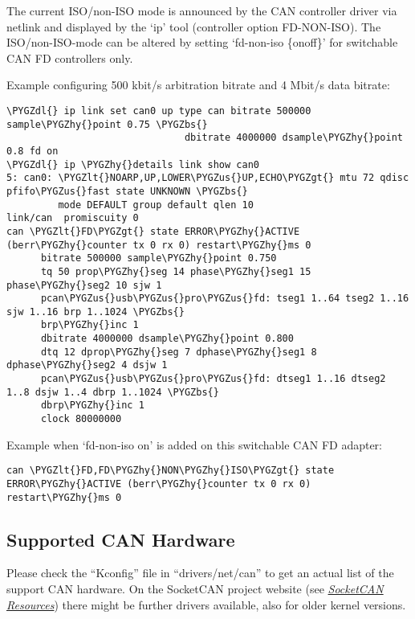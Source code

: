 \documentclass[a4paper,8pt,english]{sphinxmanual}
\def\PYGZbs{\char`\\}
\def\PYGZus{\char`\_}
\def\PYGZlt{\char`\<}
\def\PYGZgt{\char`\>}
\def\PYGZdl{\char`\$}
\def\PYGZhy{\char`\-}
\begin{document}
The current ISO/non-ISO mode is announced by the CAN controller driver via
netlink and displayed by the `ip' tool (controller option FD-NON-ISO).
The ISO/non-ISO-mode can be altered by setting `fd-non-iso \{on\textbar{}off\}' for
switchable CAN FD controllers only.

Example configuring 500 kbit/s arbitration bitrate and 4 Mbit/s data bitrate:

\begin{Verbatim}[commandchars=\\\{\}]
\PYGZdl{} ip link set can0 up type can bitrate 500000 sample\PYGZhy{}point 0.75 \PYGZbs{}
                               dbitrate 4000000 dsample\PYGZhy{}point 0.8 fd on
\PYGZdl{} ip \PYGZhy{}details link show can0
5: can0: \PYGZlt{}NOARP,UP,LOWER\PYGZus{}UP,ECHO\PYGZgt{} mtu 72 qdisc pfifo\PYGZus{}fast state UNKNOWN \PYGZbs{}
         mode DEFAULT group default qlen 10
link/can  promiscuity 0
can \PYGZlt{}FD\PYGZgt{} state ERROR\PYGZhy{}ACTIVE (berr\PYGZhy{}counter tx 0 rx 0) restart\PYGZhy{}ms 0
      bitrate 500000 sample\PYGZhy{}point 0.750
      tq 50 prop\PYGZhy{}seg 14 phase\PYGZhy{}seg1 15 phase\PYGZhy{}seg2 10 sjw 1
      pcan\PYGZus{}usb\PYGZus{}pro\PYGZus{}fd: tseg1 1..64 tseg2 1..16 sjw 1..16 brp 1..1024 \PYGZbs{}
      brp\PYGZhy{}inc 1
      dbitrate 4000000 dsample\PYGZhy{}point 0.800
      dtq 12 dprop\PYGZhy{}seg 7 dphase\PYGZhy{}seg1 8 dphase\PYGZhy{}seg2 4 dsjw 1
      pcan\PYGZus{}usb\PYGZus{}pro\PYGZus{}fd: dtseg1 1..16 dtseg2 1..8 dsjw 1..4 dbrp 1..1024 \PYGZbs{}
      dbrp\PYGZhy{}inc 1
      clock 80000000
\end{Verbatim}

Example when `fd-non-iso on' is added on this switchable CAN FD adapter:

\begin{Verbatim}[commandchars=\\\{\}]
can \PYGZlt{}FD,FD\PYGZhy{}NON\PYGZhy{}ISO\PYGZgt{} state ERROR\PYGZhy{}ACTIVE (berr\PYGZhy{}counter tx 0 rx 0) restart\PYGZhy{}ms 0
\end{Verbatim}


\subsection{Supported CAN Hardware}
\label{networking/can:supported-can-hardware}
Please check the ``Kconfig'' file in ``drivers/net/can'' to get an actual
list of the support CAN hardware. On the SocketCAN project website
(see {\hyperref[networking/can:socketcan\string-resources]{\emph{SocketCAN Resources}}}) there might be further drivers available, also for
older kernel versions.
\end{document}
